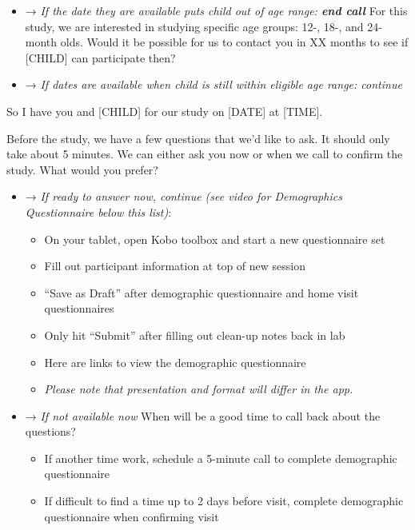 \documentclass[
]{book}
\providecommand{\tightlist}{%
  \setlength{\itemsep}{0pt}\setlength{\parskip}{0pt}}
\begin{document}
\begin{itemize}
\tightlist
\item
  → \emph{If the date they are available puts child out of age range: \textbf{end call} } For this study, we are interested in studying specific age groups: 12-, 18-, and 24-month olds. Would it be possible for us to contact you in XX months to see if {[}CHILD{]} can participate then?
\item
  → \emph{If dates are available when child is still within eligible age range: continue}
\end{itemize}

So I have you and {[}CHILD{]} for our study on {[}DATE{]} at {[}TIME{]}.

Before the study, we have a few questions that we'd like to ask. It should only take about 5 minutes. We can either ask you now or when we call to confirm the study. What would you prefer?

\begin{itemize}
\tightlist
\item
  → \emph{If ready to answer now, continue (see video for Demographics Questionnaire below this list)}:

  \begin{itemize}
  \tightlist
  \item
    On your tablet, open Kobo toolbox and start a new questionnaire set
  \item
    Fill out participant information at top of new session
  \item
    ``Save as Draft'' after demographic questionnaire and home visit questionnaires
  \item
    Only hit ``Submit'' after filling out clean-up notes back in lab
  \item
    Here are links to view the demographic questionnaire  
  \item
    \emph{Please note that presentation and format will differ in the app.}
  \end{itemize}
\item
  → \emph{If not available now} When will be a good time to call back about the questions?

  \begin{itemize}
  \tightlist
  \item
    If another time work, schedule a 5-minute call to complete demographic questionnaire
  \item
    If difficult to find a time up to 2 days before visit, complete demographic questionnaire when confirming visit
  \end{itemize}
\end{itemize}
\end{document}
